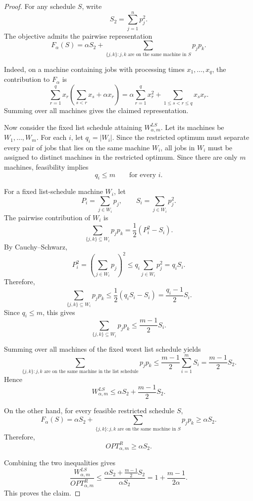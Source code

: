\documentclass[11pt]{article}
\begin{document}
\begin{proof}
For any schedule \(S\), write
\[
S_2=\sum_{j=1}^n p_j^2.
\]
The objective admits the pairwise representation
\[
F_\alpha(S)
=
\alpha S_2
+
\sum_{\{j,k\}: j,k \text{ are on the same machine in } S} p_jp_k.
\]

Indeed, on a machine containing jobs with processing times
\(x_1,\dots,x_q\), the contribution to \(F_\alpha\) is
\[
\sum_{r=1}^q x_r
\left(
\sum_{s<r}x_s+\alpha x_r
\right)
=
\alpha\sum_{r=1}^q x_r^2
+
\sum_{1\le s<r\le q}x_sx_r.
\]
Summing over all machines gives the claimed representation.

Now consider the fixed list schedule attaining \(W^{LS}_{\alpha,m}\). Let its
machines be \(W_1,\dots,W_m\). For each \(i\), let \(q_i=|W_i|\). Since the
restricted optimum must separate every pair of jobs that lies on the same
machine \(W_i\), all jobs in \(W_i\) must be assigned to distinct machines in
the restricted optimum. Since there are only \(m\) machines, feasibility
implies
\[
q_i\le m
\qquad
\text{for every } i.
\]

For a fixed list-schedule machine \(W_i\), let
\[
P_i=\sum_{j\in W_i}p_j,
\qquad
S_i=\sum_{j\in W_i}p_j^2.
\]
The pairwise contribution of \(W_i\) is
\[
\sum_{\{j,k\}\subseteq W_i}p_jp_k
=
\frac12\left(P_i^2-S_i\right).
\]
By Cauchy--Schwarz,
\[
P_i^2
=
\left(\sum_{j\in W_i}p_j\right)^2
\le
q_i \sum_{j\in W_i}p_j^2
=
q_i S_i.
\]
Therefore,
\[
\sum_{\{j,k\}\subseteq W_i}p_jp_k
\le
\frac12(q_iS_i-S_i)
=
\frac{q_i-1}{2}S_i.
\]
Since \(q_i\le m\), this gives
\[
\sum_{\{j,k\}\subseteq W_i}p_jp_k
\le
\frac{m-1}{2}S_i.
\]

Summing over all machines of the fixed worst list schedule yields
\[
\sum_{\{j,k\}: j,k \text{ are on the same machine in the list schedule}}
p_jp_k
\le
\frac{m-1}{2}\sum_{i=1}^m S_i
=
\frac{m-1}{2}S_2.
\]
Hence
\[
W^{LS}_{\alpha,m}
\le
\alpha S_2+\frac{m-1}{2}S_2.
\]

On the other hand, for every feasible restricted schedule \(S\),
\[
F_\alpha(S)
=
\alpha S_2
+
\sum_{\{j,k\}: j,k \text{ are on the same machine in }S}p_jp_k
\ge
\alpha S_2.
\]
Therefore,
\[
OPT^R_{\alpha,m}\ge \alpha S_2.
\]

Combining the two inequalities gives
\[
\frac{W^{LS}_{\alpha,m}}{OPT^R_{\alpha,m}}
\le
\frac{\alpha S_2+\frac{m-1}{2}S_2}{\alpha S_2}
=
1+\frac{m-1}{2\alpha}.
\]
This proves the claim.
\end{proof}
\end{document}
